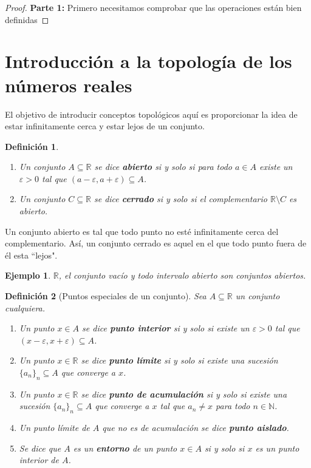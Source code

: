 \documentclass{article}
\newtheorem{define}{Definición}
\newtheorem{ejem}{Ejemplo}
\newcommand{\reales}{\mathbb{R}}
\newcommand{\naturales}{\mathbb{N}}
\newcommand{\sucesion}[1]{\{ #1 _n \}_n}
\begin{document}
\begin{proof}
\textbf{Parte 1: } Primero necesitamos comprobar que las operaciones están bien definidas
\end{proof}








\section{Introducción a la topología de los números reales}

El objetivo de introducir conceptos topológicos aquí es proporcionar la idea de estar infinitamente cerca y estar lejos de un conjunto.

\begin{define}
\begin{enumerate}
	\item
	Un conjunto $A \subseteq \reales$ se dice \textbf{abierto} si y solo si para todo $a \in A$ existe un $\varepsilon > 0$ tal que $(a - \varepsilon, a + \varepsilon) \subseteq A$.
	\item 
	Un conjunto $C \subseteq \reales$ se dice \textbf{cerrado} si y solo si el complementario $\reales \setminus C$ es abierto.
\end{enumerate}
\end{define}

Un conjunto abierto es tal que todo punto no esté infinitamente cerca del complementario. Así, un conjunto cerrado es aquel en el que todo punto fuera de él esta ``lejos".

\begin{ejem}
	$\reales$, el conjunto vacío y todo intervalo abierto son conjuntos abiertos.
\end{ejem}

\begin{define}[Puntos especiales de un conjunto]
	Sea $A \subseteq \reales$ un conjunto cualquiera.
	\begin{enumerate}
		\item
		Un punto $x \in A$ se dice \textbf{punto interior} si y solo si existe un $\varepsilon > 0$ tal que $(x - \varepsilon, x + \varepsilon) \subseteq A$.
		\item
		Un punto $x \in \reales$ se dice \textbf{punto límite} si y solo si existe una sucesión $\sucesion{a} \subseteq A$ que converge a $x$.
		\item
		Un punto $x \in \reales $ se dice \textbf{punto de acumulación} si y solo si existe una sucesión $\sucesion{a} \subseteq A$ que converge a $x$ tal que $a_n \neq x$ para todo $n \in \naturales$.
		\item
		Un punto límite de $A$ que no es de acumulación se dice \textbf{punto aislado}.
		\item
		Se dice que $A$ es un \textbf{entorno} de un punto $x \in A$ si y solo si $x$ es un punto interior de $A$.
	\end{enumerate}
\end{define}
\end{document}
